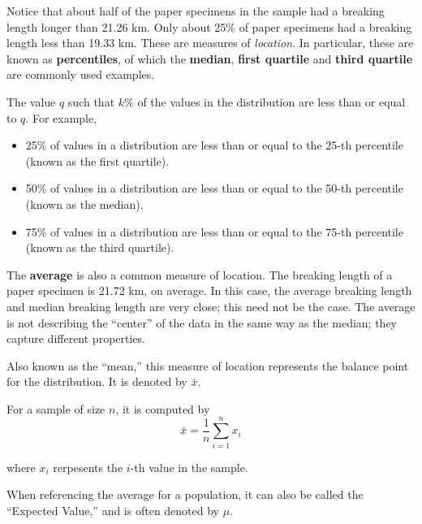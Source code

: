 \documentclass[]{book}
\providecommand{\tightlist}{%
  \setlength{\itemsep}{0pt}\setlength{\parskip}{0pt}}
\theoremstyle{definition}
\theoremstyle{definition}
\theoremstyle{remark}
\let\BeginKnitrBlock\begin \let\EndKnitrBlock\end
\begin{document}
Notice that about half of the paper specimens in the sample had a
breaking length longer than 21.26 km. Only about 25\% of paper specimens
had a breaking length less than 19.33 km. These are measures of
\emph{location}. In particular, these are known as \textbf{percentiles},
of which the \textbf{median}, \textbf{first quartile} and \textbf{third
quartile} are commonly used examples.

\BeginKnitrBlock{definition}[Percentile]
\protect\hypertarget{def:defn-percentile}{}{\label{def:defn-percentile}
{} }The value \(q\) such that \(k\)\% of the
values in the distribution are less than or equal to \(q\). For example,

\begin{itemize}
\tightlist
\item
  25\% of values in a distribution are less than or equal to the 25-th
  percentile (known as the first quartile).
\item
  50\% of values in a distribution are less than or equal to the 50-th
  percentile (known as the median).
\item
  75\% of values in a distribution are less than or equal to the 75-th
  percentile (known as the third quartile).
\end{itemize}
\EndKnitrBlock{definition}

The \textbf{average} is also a common measure of location. The breaking
length of a paper specimen is 21.72 km, on average. In this case, the
average breaking length and median breaking length are very close; this
need not be the case. The average is not describing the ``center'' of
the data in the same way as the median; they capture different
properties.

\BeginKnitrBlock{definition}[Average]
\protect\hypertarget{def:defn-average}{}{\label{def:defn-average}
{} }Also known as the ``mean,'' this measure of
location represents the balance point for the distribution. It is
denoted by \(\bar{x}\).

For a sample of size \(n\), it is computed by
\[\bar{x} = \frac{1}{n}\sum_{i=1}^{n} x_i\]

where \(x_i\) rerpesents the \(i\)-th value in the sample.

When referencing the average for a population, it can also be called the
``Expected Value,'' and is often denoted by \(\mu\).
\EndKnitrBlock{definition}
\end{document}

